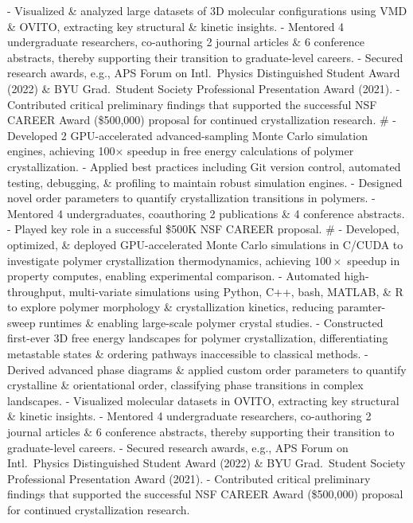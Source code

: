 - Visualized \& analyzed large datasets of 3D molecular configurations using VMD \& OVITO, extracting key structural \& kinetic insights.
- Mentored 4 undergraduate researchers, co-authoring 2 journal articles \& 6 conference abstracts, thereby supporting their transition to graduate-level careers.
- Secured research awards, e.g., APS Forum on Intl.~Physics Distinguished Student Award (2022) \& BYU Grad.~Student Society Professional Presentation Award (2021).
- Contributed critical preliminary findings that supported the successful NSF CAREER Award (\$500,000) proposal for continued crystallization research.
#
- Developed 2 GPU-accelerated advanced-sampling Monte Carlo simulation engines, achieving 100$\times$ speedup in free energy calculations of polymer crystallization.
- Applied best practices including Git version control, automated testing, debugging, \& profiling to maintain robust simulation engines.
- Designed novel order parameters to quantify crystallization transitions in polymers.
- Mentored 4 undergraduates, coauthoring 2 publications \& 4 conference abstracts.
- Played key role in a successful \$500K NSF CAREER proposal.
#
- Developed, optimized, \& deployed GPU-accelerated Monte Carlo simulations in C/CUDA to investigate polymer crystallization thermodynamics, achieving $100\times$ speedup in property computes, enabling experimental comparison.
- Automated high-throughput, multi-variate simulations using Python, C++, bash, MATLAB, \& R to explore polymer morphology \& crystallization kinetics, reducing paramter-sweep runtimes \& enabling large-scale polymer crystal studies.%
- Constructed first-ever 3D free energy landscapes for polymer crystallization, differentiating metastable states \& ordering pathways inaccessible to classical methods.%
- Derived advanced phase diagrams \& applied custom order parameters to quantify crystalline \& orientational order, classifying phase transitions in complex landscapes.
- Visualized molecular datasets in OVITO, extracting key structural \& kinetic insights.
- Mentored 4 undergraduate researchers, co-authoring 2 journal articles \& 6 conference abstracts, thereby supporting their transition to graduate-level careers.
- Secured research awards, e.g., APS Forum on Intl.~Physics Distinguished Student Award (2022) \& BYU Grad.~Student Society Professional Presentation Award (2021).
- Contributed critical preliminary findings that supported the successful NSF CAREER Award (\$500,000) proposal for continued crystallization research.
